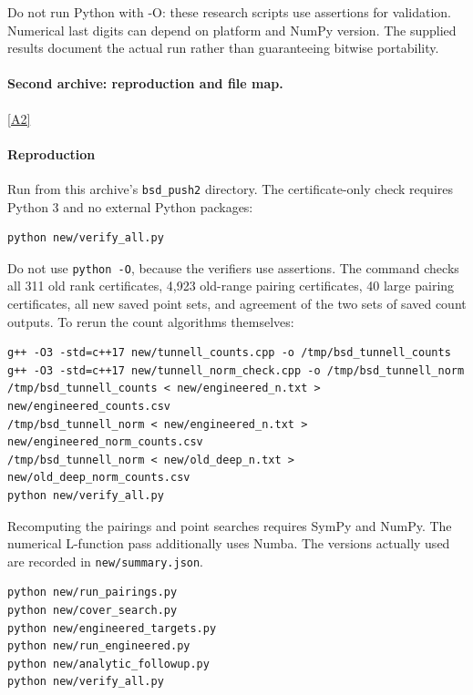 \documentclass[11pt]{article}
\newcommand{\srcref}[1]{\hyperlink{source:#1}{[#1]}}
\begin{document}
Do not run Python with -O: these research scripts use assertions for validation. Numerical last digits can depend on platform and NumPy version. The supplied results document the actual run rather than guaranteeing bitwise portability.
\paragraph{Second archive: reproduction and file map.}\srcref{A2}
\paragraph{Reproduction}

Run from this archive's \nolinkurl{bsd_push2} directory. The certificate-only check requires Python 3 and no external Python packages:

\begin{Verbatim}[breaklines=true,breakanywhere=true,fontsize=\small]
python new/verify_all.py
\end{Verbatim}

Do not use \texttt{python\ -O}, because the verifiers use assertions. The command checks all 311 old rank certificates, 4,923 old-range pairing certificates, 40 large pairing certificates, all new saved point sets, and agreement of the two sets of saved count outputs. To rerun the count algorithms themselves:

\begin{Verbatim}[breaklines=true,breakanywhere=true,fontsize=\small]
g++ -O3 -std=c++17 new/tunnell_counts.cpp -o /tmp/bsd_tunnell_counts
g++ -O3 -std=c++17 new/tunnell_norm_check.cpp -o /tmp/bsd_tunnell_norm
/tmp/bsd_tunnell_counts < new/engineered_n.txt > new/engineered_counts.csv
/tmp/bsd_tunnell_norm < new/engineered_n.txt > new/engineered_norm_counts.csv
/tmp/bsd_tunnell_norm < new/old_deep_n.txt > new/old_deep_norm_counts.csv
python new/verify_all.py
\end{Verbatim}

Recomputing the pairings and point searches requires SymPy and NumPy. The numerical L-function pass additionally uses Numba. The versions actually used are recorded in \nolinkurl{new/summary.json}.

\begin{Verbatim}[breaklines=true,breakanywhere=true,fontsize=\small]
python new/run_pairings.py
python new/cover_search.py
python new/engineered_targets.py
python new/run_engineered.py
python new/analytic_followup.py
python new/verify_all.py
\end{Verbatim}
\end{document}
